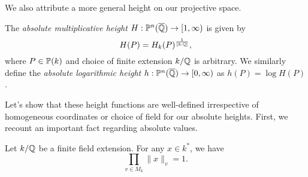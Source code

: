 We also attribute a more general height on our projective space.

\begin{definition}
    The \textit{absolute multiplicative height} $H: \mathbb{P}^n(\overline{\mathbb{Q}}) \to [1, \infty)$ is given by 
    \[
        H(P) = H_k(P)^{\frac{1}{[k : \mathbb{Q}]}},
    \]
    where $P \in \mathbb{P}(k)$ and choice of finite extension $k/\mathbb{Q}$ is arbitrary.
    We similarly define the \textit{absolute logarithmic height} $h : \mathbb{P}^n(\overline{\mathbb{Q}}) \to [0, \infty)$ as $h(P) = \log H(P)$.
\end{definition}

Let's show that these height functions are well-defined irrespective of homogeneous coordinates or choice of field for our absolute heights.
First, we recount an important fact regarding absolute values.

\begin{lemma}
    Let $k/\mathbb{Q}$ be a finite field extension.
    For any $x \in k^*$, we have
    \[
        \prod_{v \in M_k} \|x\|_v = 1.
    \]
\end{lemma}

